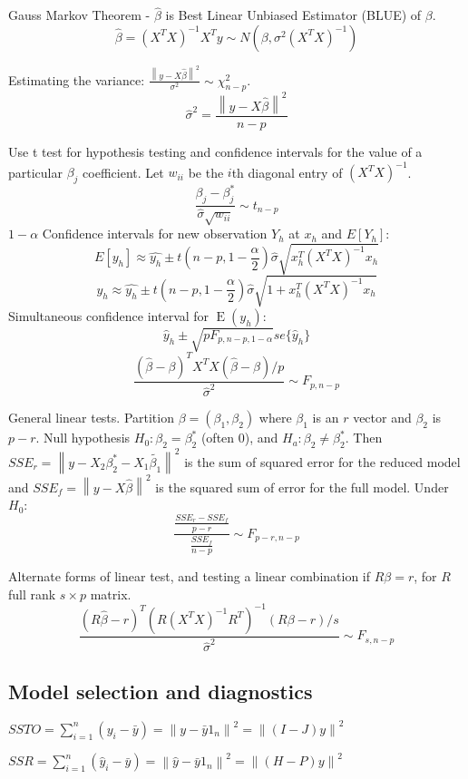\documentclass[10pt, twocolumn]{article}
\newcommand{\norm}[1]{\left\lVert#1\right\rVert}
\newcommand{\Expect}{\operatorname{E}}
\begin{document}
Gauss Markov Theorem - $\hat{\beta}$ is Best Linear Unbiased
Estimator (BLUE) of $\beta$.
\[
    \hat{\beta} = (X^T X)^{-1} X^T y \sim N(\beta, \sigma^2 (X^T X)^{-1})
\]

Estimating the variance: $\frac{\norm{y - X \hat{\beta}}^2}{\sigma^2} \sim
\chi^2_{n-p}$.
\[
    \hat{\sigma}^2 = \frac{\norm{y - X \hat{\beta}}^2}{n - p}
\]

Use t test for hypothesis testing and confidence intervals for the value of
a particular $\beta_j$ coefficient. 
Let $w_{ii}$ be the $i$th diagonal entry of $(X^T X)^{-1}$.
\[
    \frac{\beta_j - \beta_j^*}{\hat{\sigma} \sqrt{w_{ii}}} \sim t_{n-p}
\]
$1 - \alpha$ Confidence intervals for new observation $Y_h$ at $x_h$ and $E[Y_h]$:
\[
    E[y_h] \approx \hat{y_h} \pm t(n-p, 1 - \frac{\alpha}{2}) \hat{\sigma}
        \sqrt{x_h^T (X^T X)^{-1} x_h}
\]
\[
    y_h \approx \hat{y_h} \pm t(n-p, 1 - \frac{\alpha}{2}) \hat{\sigma}
        \sqrt{1 + x_h^T (X^T X)^{-1} x_h}
\]
Simultaneous confidence interval for $\Expect (y_h)$:
\[
    \hat{y}_h \pm \sqrt{p F_{p, n - p, 1 - \alpha}} se\{ \hat{y}_h \}
\]
\[
    \frac{(\hat{\beta} - \beta)^T X^T X (\hat{\beta} - \beta) /
    p}{\hat{\sigma}^2}
    \sim F_{p, n - p}
\]

General linear tests. Partition $\beta = (\beta_1, \beta_2)$ where $\beta_1$
is an $r$ vector and $\beta_2$ is $p - r$. Null hypothesis $H_0: \beta_2 =
\beta_2^*$ (often 0), and $H_a: \beta_2 \neq \beta_2^*$. Then
$SSE_r = \norm{y - X_2 \beta_2^* - X_1 \tilde{\beta_1}}^2$ is the sum of
squared error for the reduced model and 
$SSE_f = \norm{y - X \hat{\beta}}^2$ is the squared sum of error for the
full model.
Under $H_0$:
\[
    \frac{\frac{SSE_r - SSE_f}{p - r}}
         {\frac{SSE_f}{n - p}}
         \sim F_{p-r, n-p}
\]

Alternate forms of linear test, and testing a linear combination if $R\beta
= r$, for $R$ full rank $s \times p$ matrix.
\[
    \frac{(R \hat{\beta} - r)^T (R(X^T X)^{-1} R^T)^{-1} (R \beta - r) / s}
    {\hat{\sigma}^2} \sim F_{s, n-p}
\]


\subsection*{Model selection and diagnostics}

$SSTO = \sum_{i=1}^n (y_i - \bar{y}) = \norm{y - \bar{y} 1_n }^2
        = \norm{(I - J)y}^2$

$SSR = \sum_{i=1}^n (\hat{y}_i - \bar{y}) = \norm{\hat{y} - \bar{y} 1_n}^2
    = \norm{(H - P)y}^2$
\end{document}
